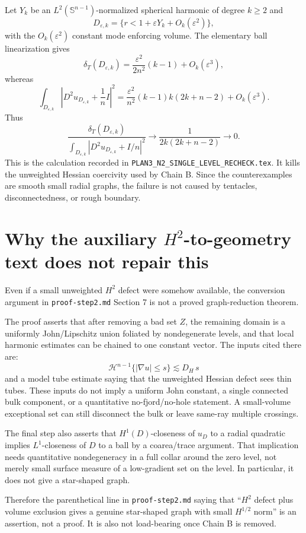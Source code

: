 \documentclass[11pt]{article}
\newcommand{\dT}{\delta_T}
\newcommand{\Sph}{\mathbb S}
\begin{document}
Let \(Y_k\) be an \(L^2(\Sph^{n-1})\)-normalized spherical harmonic of degree
\(k\ge 2\) and
\[
   D_{\varepsilon,k}
      =\{r<1+\varepsilon Y_k+O_k(\varepsilon^2)\},
\]
with the \(O_k(\varepsilon^2)\) constant mode enforcing volume.  The elementary
ball linearization gives
\[
   \dT(D_{\varepsilon,k})
      =
      \frac{\varepsilon^2}{2n^2}(k-1)+O_k(\varepsilon^3),
\]
whereas
\[
   \int_{D_{\varepsilon,k}}
      \left|D^2u_{D_{\varepsilon,k}}+\frac1nI\right|^2
      =
      \frac{\varepsilon^2}{n^2}(k-1)k(2k+n-2)+O_k(\varepsilon^3).
\]
Thus
\[
   \frac{\dT(D_{\varepsilon,k})}
        {\int_{D_{\varepsilon,k}}|D^2u_{D_{\varepsilon,k}}+I/n|^2}
      \to
      \frac{1}{2k(2k+n-2)}
      \to 0.
\]
This is the calculation recorded in
\texttt{PLAN3\_N2\_SINGLE\_LEVEL\_RECHECK.tex}.  It kills the unweighted
Hessian coercivity used by Chain B.  Since the counterexamples are smooth
small radial graphs, the failure is not caused by tentacles, disconnectedness,
or rough boundary.

\section{Why the auxiliary \(H^2\)-to-geometry text does not repair this}

Even if a small unweighted \(H^2\) defect were somehow available, the
conversion argument in \texttt{proof-step2.md} Section 7 is not a proved
graph-reduction theorem.

The proof asserts that after removing a bad set \(Z\), the remaining domain is
a uniformly John/Lipschitz union foliated by nondegenerate levels, and that
local harmonic estimates can be chained to one constant vector.  The inputs
cited there are:
\[
   \mathcal H^{n-1}\{|\nabla u|\le s\}\lesssim D_H\,s
\]
and a model tube estimate saying that the unweighted Hessian defect sees thin
tubes.  These inputs do not imply a uniform John constant, a single connected
bulk component, or a quantitative no-fjord/no-hole statement.  A small-volume
exceptional set can still disconnect the bulk or leave same-ray multiple
crossings.

The final step also asserts that \(H^1(D)\)-closeness of \(u_D\) to a radial
quadratic implies \(L^1\)-closeness of \(D\) to a ball by a coarea/trace
argument.  That implication needs quantitative nondegeneracy in a full collar
around the zero level, not merely small surface measure of a low-gradient set
on the level.  In particular, it does not give a star-shaped graph.

Therefore the parenthetical line in \texttt{proof-step2.md} saying that
``\(H^2\) defect plus volume exclusion gives a genuine star-shaped graph with
small \(H^{1/2}\) norm'' is an assertion, not a proof.  It is also not
load-bearing once Chain B is removed.
\end{document}
